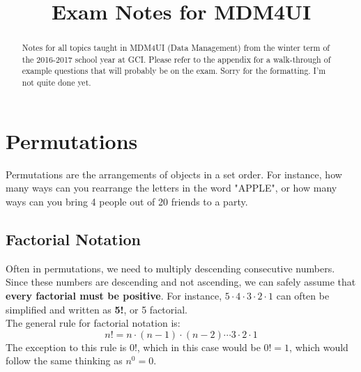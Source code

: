 \documentclass[final,1p,12pt]{elsarticle}
\begin{document}
\begin{frontmatter}
    \title{Exam Notes for MDM4UI}
    \begin{abstract}
        Notes for all topics taught in MDM4UI (Data Management) from the winter term of the 2016-2017 school year at GCI.  Please refer to the appendix for a walk-through of example questions that will probably be on the exam. Sorry for the formatting. I'm not quite done yet.
    \end{abstract}
\end{frontmatter}

\section{Permutations}
Permutations are the arrangements of objects in a set order. 
For instance, how many ways can you rearrange the letters in the word "APPLE", 
or how many ways can you bring 4 people out of 20 friends to a party.

    \subsection{Factorial Notation}
    Often in permutations, we need to multiply descending consecutive numbers. Since these numbers
    are descending and not ascending, we can safely assume that \textbf{every factorial must be positive}. 
    For instance,  $5\cdot4\cdot3\cdot2\cdot1$ can often be simplified and written as \textbf{5!}, or 5 factorial.\\
    The general rule for factorial notation is: 
    \begin{equation*}%
        n! = n\cdot(n-1)\cdot(n-2)\cdots3\cdot2\cdot1
    \end{equation*}
    The exception to this rule is 0!, which in this case would be $0! = 1$, which would follow the same thinking as $n^0=0$.%
    
\end{document}
